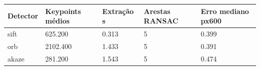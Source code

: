 \begin{tabular}{lllll}
\hline
Detector & Keypoints médios & Extração s & Arestas RANSAC & Erro mediano px600 \\ \hline
sift & 625.200 & 0.313 & 5 & 0.399 \\
orb & 2102.400 & 1.433 & 5 & 0.391 \\
akaze & 281.200 & 1.543 & 5 & 0.474 \\
\hline
\end{tabular}
